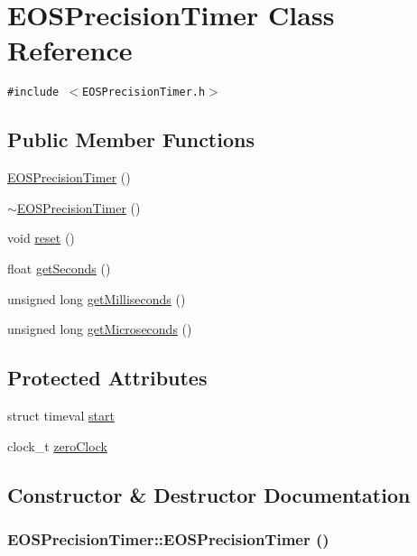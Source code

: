 \hypertarget{classEOSPrecisionTimer}{
\section{EOSPrecisionTimer Class Reference}
\label{classEOSPrecisionTimer}
}
{\tt \#include $<$EOSPrecisionTimer.h$>$}

\subsection*{Public Member Functions}
\begin{CompactItemize}
\item 
\hyperlink{classEOSPrecisionTimer_9244335a06679b244bcc59093871c66c}{EOSPrecisionTimer} ()
\item 
\hyperlink{classEOSPrecisionTimer_4973b1bf298dd2bf40e3e6408866e5f3}{$\sim$EOSPrecisionTimer} ()
\item 
void \hyperlink{classEOSPrecisionTimer_252f1f26efaad6d549de98f9364389ad}{reset} ()
\item 
float \hyperlink{classEOSPrecisionTimer_5f4013cc8027df9d6f2116c587cbe932}{getSeconds} ()
\item 
unsigned long \hyperlink{classEOSPrecisionTimer_3a00c85250081df249a733834dee161b}{getMilliseconds} ()
\item 
unsigned long \hyperlink{classEOSPrecisionTimer_63c07c72120f792bc79dbd72f3f03d7a}{getMicroseconds} ()
\end{CompactItemize}
\subsection*{Protected Attributes}
\begin{CompactItemize}
\item 
struct timeval \hyperlink{classEOSPrecisionTimer_df3423fdc02dd0f4356493f2a5733b6e}{start}
\item 
clock\_\-t \hyperlink{classEOSPrecisionTimer_74532635410d19d7294fe12c31b6549c}{zeroClock}
\end{CompactItemize}


\subsection{Constructor \& Destructor Documentation}
\hypertarget{classEOSPrecisionTimer_9244335a06679b244bcc59093871c66c}{
\subsubsection[{EOSPrecisionTimer}]{\setlength{\rightskip}{0pt plus 5cm}EOSPrecisionTimer::EOSPrecisionTimer ()}}
\label{classEOSPrecisionTimer_9244335a06679b244bcc59093871c66c}


